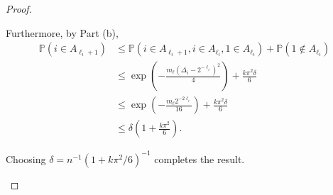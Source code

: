 \begin{proof}
\begin{enumerate}
        Furthermore, by Part (b),
        \begin{equation*}
            \begin{aligned}
                \mathbb{P}\left(i \in A_{\ell_{i}+1}\right) & \leq \mathbb{P}\left(i \in A_{\ell_{i}+1}, i \in A_{\ell_{i}}, 1 \in A_{\ell_{i}}\right)+\mathbb{P}\left(1 \notin A_{\ell_{i}}\right) \\
                & \leq \exp \left(-\frac{m_{\ell}\left(\Delta_{i}-2^{-\ell_{i}}\right)^{2}}{4}\right)+\frac{k \pi^{2} \delta}{6} \\
                & \leq \exp \left(-\frac{m_{\ell} 2^{-2 \ell_{i}}}{16}\right)+\frac{k \pi^{2} \delta}{6} \\
                & \leq \delta\left(1+\frac{k \pi^{2}}{6}\right).
            \end{aligned}
        \end{equation*}

        Choosing $\delta=n^{-1}\left(1+k \pi^{2} / 6\right)^{-1}$ completes the result.
    \end{enumerate}
\end{proof}